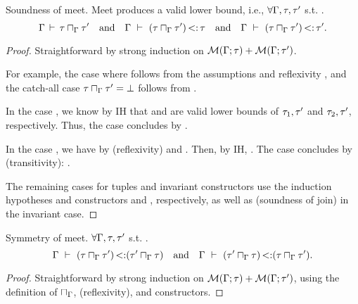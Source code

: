 \begin{theorem}{Soundness of meet.}%
\label{thm:meet-sound}
    Meet produces a valid lower bound, i.e., 
    $\forall \Gamma, \tau, \tau'$ s.t. .
    \[
        \Gamma\,\vdash\,\tau \sqcap_{\Gamma} \tau'
        \quad\text{and}\quad
        \Gamma\ \vdash\ (\tau \sqcap_{\Gamma} \tau') \operatorname{<:} \tau
        \quad\text{and}\quad
        \Gamma\ \vdash\ (\tau \sqcap_{\Gamma} \tau') \operatorname{<:} \tau'.
    \]
\end{theorem}
\begin{proof}
    Straightforward by strong induction on
    $\operatorname{\mathcal{M}}(\Gamma;\tau) + \operatorname{\mathcal{M}}(\Gamma;\tau')$.

    For example, the case where  follows from
    the assumptions and reflexivity \subtydflt{\ty}{\ty},
    and the catch-all case $\tau \sqcap_{\Gamma} \tau' = \bot$
    follows from .

    In the case ,
    we know by IH that  and 
    are valid lower bounds of $\tau_1,\tau'$ and $\tau_2,\tau'$, respectively.
    Thus, the case concludes by .

    In the case , we have \subtydflt{\tylb}{\vany}
    by  (reflexivity) and .
    Then, by IH, .
    The case concludes by  (transitivity):
    .
    
    The remaining cases for tuples and invariant constructors
    use the induction hypotheses and constructors  and ,
    respectively, as well as  (soundness of join)
    in the invariant case.
\end{proof}

\begin{lemma}{Symmetry of meet.}
    $\forall \Gamma, \tau, \tau'$ s.t. .
    \[
        \Gamma\ \vdash\ (\tau \sqcap_{\Gamma} \tau') \operatorname{<:} (\tau' \sqcap_{\Gamma} \tau)
        \quad\text{and}\quad
        \Gamma\ \vdash\ (\tau' \sqcap_{\Gamma} \tau) \operatorname{<:} (\tau \sqcap_{\Gamma} \tau').
    \]
\end{lemma}
\begin{proof}
    Straightforward by strong induction on
    $\operatorname{\mathcal{M}}(\Gamma;\tau) + \operatorname{\mathcal{M}}(\Gamma;\tau')$,
    using the definition of $\sqcap_{\Gamma}$,
     (reflexivity),
    and \RST{} constructors.
\end{proof}



